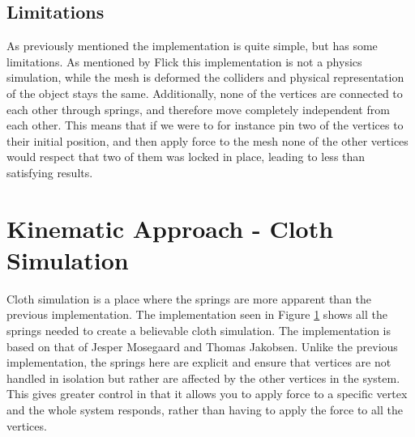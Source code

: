 \subsection{Limitations}
As previously mentioned the implementation is quite simple, but has some limitations.
As mentioned by Flick\cite{catlike_mesh_deformation} this implementation is not a physics simulation, while the mesh is deformed
the colliders and physical representation of the object stays the same.
Additionally, none of the vertices are connected to each other through springs, and therefore move completely independent from each other.
This means that if we were to for instance pin two of the vertices to their initial position, and then apply force to the mesh
none of the other vertices would respect that two of them was locked in place, leading to less than satisfying results.

\section{Kinematic Approach - Cloth Simulation}
Cloth simulation is a place where the springs are more apparent than the previous implementation.
The implementation seen in Figure \ref{fig:my_cloth_implementation_springs} shows all the springs needed to create a believable cloth simulation.
The implementation is based on that of Jesper Mosegaard\cite{mosegaards_clothing_simulation} and Thomas Jakobsen\cite{jakobsen_advanced_character_physics}.
Unlike the previous implementation, the springs here are explicit and ensure that vertices are not handled in isolation but rather are affected by the other vertices in the system.
This gives greater control in that it allows you to apply force to a specific vertex and the whole system responds, rather than having to apply the force to all the vertices.

\begin{figure}
    \label{fig:my_cloth_implementation_springs}
\end{figure}

